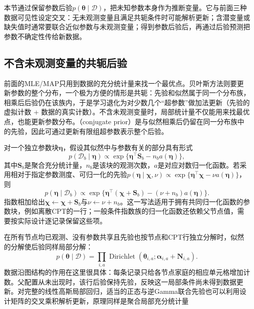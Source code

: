 本节通过保留参数后验$p(\bm{\theta}\mid\mathcal{D})$，把未知参数本身作为推断变量。它与前面三种数据可见性设定交叉：无未观测变量且满足共轭条件时可能解析更新；含潜变量或缺失值时通常要联合近似参数与未观测变量；得到参数后验后，再通过后验预测把参数不确定性传给新数据。

\subsection{不含未观测变量的共轭后验}
\label{sec:pgm-parameter-learning-conjugacy}

前面的MLE/MAP只用到数据的充分统计量来找一个最优点。贝叶斯方法则要更新参数的整个分布，一个极为方便的情形是共轭：先验和似然属于同一个分布族，相乘后后验仍在该族内，于是学习退化为对少数几个“超参数”做加法更新（先验的虚拟计数 + 数据的真实计数）。不含未观测变量时，局部统计量不仅能用来找最优点，也能更新参数分布。（conjugate prior）是与似然相乘后仍留在同一分布族中的先验，因此可通过更新有限组超参数表示整个后验。

对一个独立参数块$\bm{\eta}$，假设其似然中与参数有关的部分具有形式
\[
  p(\mathcal{D}_b\mid\bm{\eta})
  \propto\exp\{\bm{\eta}^\top\bm{S}_b-n_ba(\bm{\eta})\},
\]
其中$\bm{S}_b$是聚合充分统计量，$n_b$是该块的观测次数，$a$是对应对数归一化函数。若采用相对于指定参数测度、可归一化的先验$p(\bm{\eta}\mid\bm{\chi},\nu)\propto\exp\{\bm{\eta}^\top\bm{\chi}-\nu a(\bm{\eta})\}$，则
\begin{equation}
  p(\bm{\eta}\mid\mathcal{D}_b)
  \propto
  \exp\{\bm{\eta}^\top(\bm{\chi}+\bm{S}_b)
                 -(\nu+n_b)a(\bm{\eta})\}.
  \label{eq:pgm-parameter-learning-conjugate-update}
\end{equation}
指数相加给出$\bm{\chi}\leftarrow\bm{\chi}+\bm{S}_b$与$\nu\leftarrow\nu+n_b$。这一写法适用于拥有共同归一化函数的参数块，例如离散CPT的一行；一般条件指数族的归一化函数还依赖父节点值，需要按实际设计逐记录保留这些项。

在所有节点均已观测、没有参数共享且先验也按节点和CPT行独立分解时，似然的分解使后验同样局部分解：
\begin{equation}
  p(\bm{\theta}\mid\mathcal{D})
   =\prod_{i,a}
     \operatorname{Dirichlet}
       (\bm{\theta}_{i,a};
        \bm{\alpha}_{i,a}+\bm{N}_{i,a}).
  \label{eq:pgm-parameter-learning-local-posterior}
\end{equation}
数据沿图结构的作用在这里很具体：每条记录只给各节点家庭的相应单元格增加计数。父配置从未出现时，该行后验保持先验，反映这一局部条件尚未得到数据更新。对完整的线性高斯局部回归，适当的正态与逆Gamma联合先验也可以利用设计矩阵的交叉乘积解析更新，原理同样是聚合局部充分统计量

